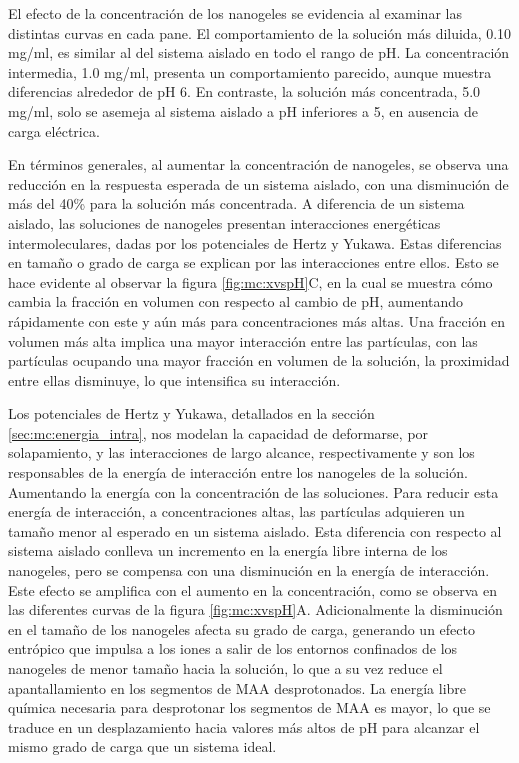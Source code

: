 	El efecto de la concentraci\'on de los nanogeles se evidencia al examinar las distintas curvas en cada pane. El comportamiento de la soluci\'on m\'as diluida, 0.10 mg/ml, es similar al del sistema aislado en todo el rango de pH. La concentraci\'on intermedia, 1.0 mg/ml, presenta un comportamiento parecido, aunque muestra diferencias alrededor de pH 6. En contraste, la soluci\'on m\'as concentrada, 5.0 mg/ml, solo se asemeja al sistema aislado a pH inferiores a 5, en ausencia de carga el\'ectrica.
	
	En t\'erminos generales, al aumentar la concentraci\'on de nanogeles, se observa una reducci\'on en la respuesta esperada de un sistema aislado, con una disminuci\'on de m\'as del 40\% para la soluci\'on m\'as concentrada. A diferencia de un sistema aislado, las soluciones de nanogeles presentan interacciones energ\'eticas intermoleculares, dadas por los potenciales de Hertz y Yukawa. Estas diferencias en tama\~no o grado de carga se explican por las interacciones entre ellos. Esto se hace evidente al observar la figura \ref{fig:mc:xvspH}C, en la cual se muestra c\'omo cambia la fracci\'on en volumen con respecto al cambio de pH, aumentando r\'apidamente con este y a\'un m\'as para concentraciones m\'as altas. Una fracci\'on en volumen m\'as alta implica una mayor interacci\'on entre las part\'iculas, con las part\'iculas ocupando una mayor fracci\'on en volumen de la soluci\'on, la proximidad entre ellas disminuye, lo que intensifica su interacci\'on.
	
	Los potenciales de Hertz y Yukawa, detallados en la secci\'on \ref{sec:mc:energia_intra}, nos modelan  la capacidad de deformarse, por solapamiento, y las interacciones de largo alcance, respectivamente y son los responsables de la energ\'ia de interacci\'on entre los nanogeles de la soluci\'on. Aumentando la energ\'ia con la concentraci\'on de las soluciones.
	Para reducir esta energ\'ia de interacci\'on, a concentraciones altas,  las part\'iculas adquieren un tama\~no menor al esperado en un sistema aislado. Esta diferencia con respecto al sistema aislado conlleva un incremento en la energ\'ia libre interna de los nanogeles, pero se compensa con una disminuci\'on en la energ\'ia de interacci\'on. Este efecto se amplifica con el aumento en la concentraci\'on, como se observa en las diferentes curvas de la figura \ref{fig:mc:xvspH}A. 
	Adicionalmente la disminuci\'on en el tama\~no de los nanogeles afecta su grado de carga, generando un efecto entr\'opico que impulsa a los iones a salir de los entornos confinados de los nanogeles de menor tama\~no hacia la soluci\'on, lo que a su vez reduce el apantallamiento en los segmentos de MAA desprotonados. La energ\'ia libre qu\'imica necesaria para desprotonar los segmentos de MAA es mayor, lo que se traduce en un desplazamiento hacia valores m\'as altos de pH para alcanzar el mismo grado de carga que un sistema ideal.
	
